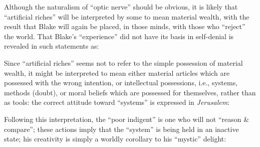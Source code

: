 
Although the naturalism of \enquote{optic nerve} should be obvious, it is likely that \enquote{artificial riches}
will be interpreted by some to mean material wealth, with the result that Blake
will again be placed, in those minds, with those who \enquote{reject} the world.
That Blake's \enquote{experience} did not have its basis in self-denial is revealed in such statements as:


Since \enquote{artificial riches} seems not to refer to the simple possession of material wealth, it might be interpreted
to mean either material articles which are possessed with the wrong intention, or intellectual
possessions, i.e., systems, methods (doubt), or moral beliefs which are possessed for themselves,
rather than as tools: the correct attitude toward \enquote{systems} is expressed in \emph{Jerusalem}:


Following this interpretation, the \enquote{poor indigent} is one who will not \enquote{reason \& compare}; these actions imply that
the \enquote{system} is being held in an inactive state; his creativity is simply a worldly
corollary to his \enquote{mystic} delight:

